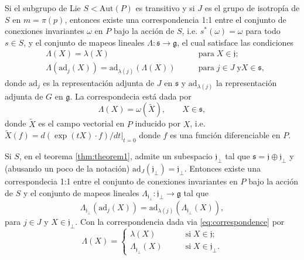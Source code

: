 \begin{thm}
\label{thm:theorem1}
Si el subgrupo de Lie $S < \mathrm{Aut} (P)$ es transitivo y si $J$ es el grupo de isotrop\'{i}a de $S$ en $m = \pi(p)$, entonces existe una correspondencia 1:1 entre el conjunto de conexiones invariantes $\omega$ en $P$ bajo la acci\'{o}n de $S$, i.e. $s^{*}(\omega) = \omega$ para todo $s \in S$, y el conjunto de mapeos lineales $\Lambda: \mathfrak{s} \longrightarrow \mathfrak{g}$, el cual satisface las condiciones
%
\begin{align}
\label{eq:LambdaCond1}
& \Lambda (X) = \lambda (X) & \mathrm{para} \; X\in \mathfrak{j}; \\
\label{eq:LambdaCond2}
& \Lambda (\mathrm{ad}_{j} (X)) = \mathrm{ad}_{\lambda (j)} (\Lambda (X)) \qquad & \mathrm{para} \; j \in J \; \mathrm{y} X \in \mathfrak{s},
\end{align}
%
donde $\mathrm{ad}_{j}$ es la representaci\'{o}n adjunta de $J$ en $\mathfrak{s}$ y $\mathrm{ad}_{\lambda (j)}$ la representaci\'{o}n adjunta de $G$ en $\mathfrak{g}$. La correspondecia est\'{a} dada por
%
\begin{equation}
\label{eq:correspondence}
\Lambda (X) = \omega (\tilde{X}), \qquad X \in \mathfrak{s},
\end{equation}
%
donde $\tilde{X}$ es el campo vectorial en $P$ inducido por $X$, i.e. $\tilde{X}(f) = d(\exp(t X) \cdot f)/dt \vert_{t=0}$ donde $f$ es una funci\'{o}n diferenciable en $P$.
\end{thm}

\begin{thm}
\label{thm:reductive}
Si $S$, en el teorema \ref{thm:theorem1}, admite un subespacio $\mathfrak{j}_{\perp}$ tal que $\mathfrak{s} = \mathfrak{j} \oplus \mathfrak{j}_{\perp}$ y (abusando un poco de la notaci\'{o}n) $\mathrm{ad}_{J} (\mathfrak{j}_{\perp}) = \mathfrak{j}_{\perp}$. Entonces existe una correspondecia 1:1 entre el conjunto de conexiones invariantes en $P$ bajo la acci\'{o}n de $S$ y el conjunto de mapeos lineales $\Lambda_{\mathfrak{j}_{\perp}}: \mathfrak{j}_{\perp} \longrightarrow \mathfrak{g}$ tal que
%
\begin{equation}
\label{eq:HiggsField}
\Lambda_{\mathfrak{j}_{\perp}} (\mathrm{ad}_{j} (X)) = \mathrm{ad}_{\lambda (j)} (\Lambda_{\mathfrak{j}_{\perp}} (X)),
\end{equation}
%
para $j \in J$ y $X \in \mathfrak{j}_{\perp}$. Con la correspondencia dada via \eqref{eq:correspondence} por
%
$$
\Lambda (X) = 
\begin{cases}
\lambda (X) \qquad & \mathrm{si} \; X\in \mathfrak{j}; \\
\Lambda_{\mathfrak{j}_{\perp}} (X) \qquad & \mathrm{si} \; X \in \mathfrak{j}_{\perp}.
\end{cases}
$$
%
\end{thm}

